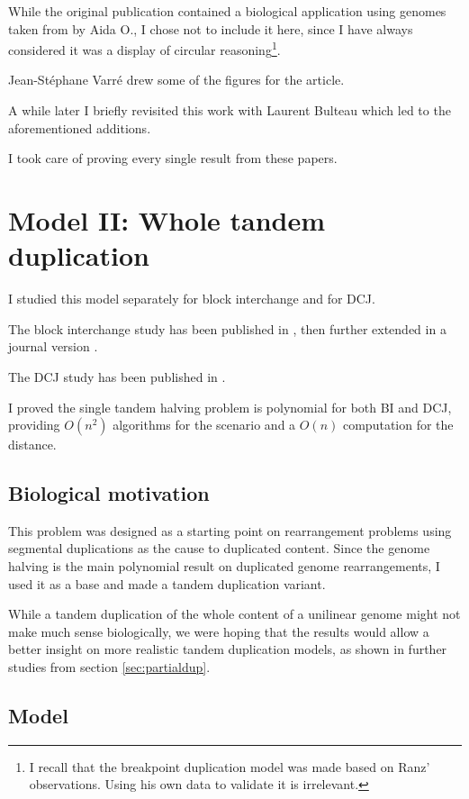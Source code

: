 \documentclass[11pt,final,twoside,nofrench]{thlifl}
\begin{document}
While the original publication contained a biological application using genomes taken from \cite{R07} by Aida O., I chose not to include it here, since I have always considered it was a display of circular reasoning\footnote{I recall that the breakpoint duplication model was made based on Ranz' observations. Using his own data to validate it is irrelevant.}.

Jean-Stéphane Varré drew some of the figures for the article.

A while later I briefly revisited this work with Laurent Bulteau which led to the aforementioned additions.

I took care of proving every single result from these papers.

\section{Model II: Whole tandem duplication}
\label{sec:wholetandem}

I studied this model separately for block interchange and for DCJ.

The block interchange study has been published in \cite{Thomas13pre}, then further extended in a journal version \cite{Thomas13}.

The DCJ study has been published in \cite{Thomas12}.

I proved the single tandem halving problem is polynomial for both BI and DCJ, providing $O(n^2)$ algorithms for the scenario and a $O(n)$ computation for the distance.

\subsection{Biological motivation}

This problem was designed as a starting point on rearrangement problems using segmental duplications as the cause to duplicated content. Since the genome halving is the main polynomial result on duplicated genome rearrangements, I used it as a base and made a tandem duplication variant.

While a tandem duplication of the whole content of a unilinear genome might not make much sense biologically, we were hoping that the results would allow a better insight on more realistic tandem duplication models, as shown in further studies from section \ref{sec:partialdup}.

\subsection{Model}
\end{document}
